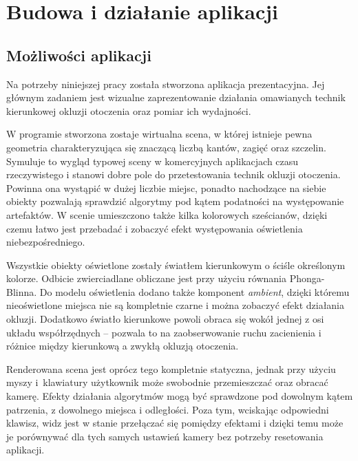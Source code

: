 \chapter{Budowa i działanie aplikacji}
\label{t:budowa}

	\section{Możliwości aplikacji}
	\label{t:budowa:mozliw}
	
	
	Na potrzeby niniejszej pracy została stworzona aplikacja prezentacyjna. Jej głównym zadaniem jest wizualne zaprezentowanie działania omawianych technik kierunkowej okluzji otoczenia oraz pomiar ich wydajności. 
	
	W programie stworzona zostaje wirtualna scena, w której istnieje pewna geometria charakteryzująca się znaczącą liczbą kantów, zagięć oraz szczelin. Symuluje to wygląd typowej sceny w komercyjnych aplikacjach czasu rzeczywistego i stanowi dobre pole do przetestowania technik okluzji otoczenia. Powinna ona wystąpić w dużej liczbie miejsc, ponadto nachodzące na siebie obiekty pozwalają sprawdzić algorytmy pod kątem podatności na występowanie artefaktów. W scenie umieszczono także kilka kolorowych sześcianów, dzięki czemu łatwo jest przebadać i zobaczyć efekt występowania oświetlenia niebezpośredniego.
	
	Wszystkie obiekty oświetlone zostały światłem kierunkowym o ściśle określonym kolorze. Odbicie zwierciadlane obliczane jest przy użyciu równania Phonga-Blinna. Do modelu oświetlenia dodano także komponent \emph{ambient}, dzięki któremu nieoświetlone miejsca nie są kompletnie czarne i można zobaczyć efekt działania okluzji. Dodatkowo światło kierunkowe powoli obraca się wokół jednej z osi układu współrzędnych -- pozwala to na zaobserwowanie ruchu zacienienia i różnice między kierunkową a zwykłą okluzją otoczenia.
	
	Renderowana scena jest oprócz tego kompletnie statyczna, jednak przy użyciu myszy i~klawiatury użytkownik może swobodnie przemieszczać oraz obracać kamerę. Efekty działania algorytmów mogą być sprawdzone pod dowolnym kątem patrzenia, z dowolnego miejsca i odległości. Poza tym, wciskając odpowiedni klawisz, widz jest w stanie przełączać się pomiędzy efektami i dzięki temu może je porównywać dla tych samych ustawień kamery bez potrzeby resetowania aplikacji.
	
